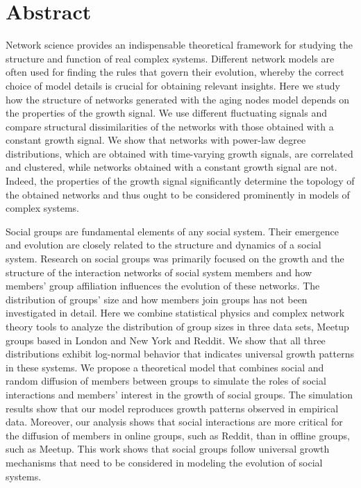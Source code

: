 
\normalsize

\chapter{Abstract}


Network science provides an indispensable theoretical framework for
studying the structure and function of real complex systems. Different
network models are often used for finding the rules that govern their
evolution, whereby the correct choice of model details is crucial for
obtaining relevant insights. Here we study how the structure of
networks generated with the aging nodes model depends on the
properties of the growth signal. We use different fluctuating signals
and compare structural dissimilarities of the networks with those
obtained with a constant growth signal. We show that networks with
power-law degree distributions, which are obtained with time-varying
growth signals, are correlated and clustered, while networks obtained
with a constant growth signal are not. Indeed, the properties of the
growth signal significantly determine the topology of the obtained
networks and thus ought to be considered prominently in models of
complex systems.

Social groups are fundamental elements of any social system. Their emergence and evolution are closely related to the structure and dynamics of a social system. Research on social groups was primarily focused on the growth and the structure of the interaction networks of social system members and how members' group affiliation influences the evolution of these networks. The distribution of groups' size and how members join groups has not been investigated in detail. Here we combine statistical physics and complex network theory tools to analyze the distribution of group sizes in three data sets, Meetup groups based in London and New York and Reddit. We show that all three distributions exhibit log-normal behavior that indicates universal growth patterns in these systems. We propose a theoretical model that combines social and random diffusion of members between groups to simulate the roles of social interactions and members' interest in the growth of social groups. The simulation results show that our model reproduces growth patterns observed in empirical data. Moreover, our analysis shows that social interactions are more critical for the diffusion of members in online groups, such as Reddit, than in offline groups, such as Meetup. This work shows that social groups follow universal growth mechanisms that need to be considered in modeling the evolution of social systems. 

